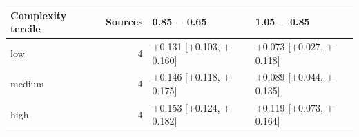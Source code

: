 \begin{tabular}{lrll}
\toprule
Complexity tercile & Sources & 0.85 $-$ 0.65 & 1.05 $-$ 0.85 \\
\midrule
low & 4 & $+$0.131 [$+$0.103, $+$0.160] & $+$0.073 [$+$0.027, $+$0.118] \\
medium & 4 & $+$0.146 [$+$0.118, $+$0.175] & $+$0.089 [$+$0.044, $+$0.135] \\
high & 4 & $+$0.153 [$+$0.124, $+$0.182] & $+$0.119 [$+$0.073, $+$0.164] \\
\bottomrule
\end{tabular}
